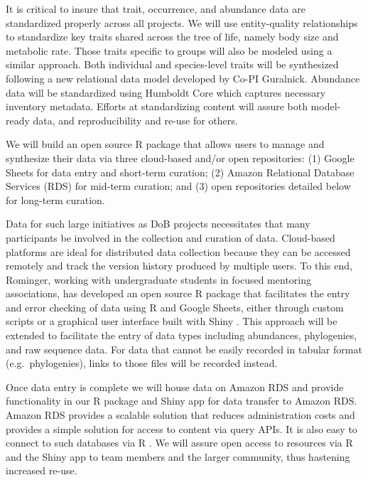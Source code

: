 \documentclass[11pt]{article}
\begin{document}
It is critical to insure that trait, occurrence, and abundance data
are standardized properly across all projects. We will use
entity-quality relationships to standardize key traits shared across
the tree of life, namely body size and metabolic rate. Those traits
specific to groups will also be modeled using a similar approach. Both
individual and species-level traits will be synthesized following a
new relational data model developed by Co-PI Guralnick.  Abundance
data will be standardized using Humboldt Core \cite{Guralnick2017-xb}
which captures necessary inventory metadata. Efforts at standardizing
content will assure both model-ready data, and reproducibility and
re-use for others.

We will build an open source R package that allows users to manage and
synthesize their data via three cloud-based and/or open repositories:
(1) Google Sheets for data entry and short-term curation; (2) Amazon
Relational Database Services (RDS) for mid-term curation; and (3) open
repositories detailed below for long-term curation.

Data for such large initiatives as DoB projects necessitates that many
participants be involved in the collection and curation of data.
Cloud-based platforms are ideal for distributed data collection because
they can be accessed remotely and track the version history produced by
multiple users. To this end, Rominger, working with undergraduate
students in focused mentoring associations, has developed an open source
R package \cite{Rominger2016-mq} that facilitates the entry and error
checking of data using R and Google Sheets, either through custom
scripts or a graphical user interface built with Shiny
\cite{RStudio_Inc2013-bt}. This approach will be extended to facilitate
the entry of data types including abundances, phylogenies, and raw
sequence data. For data that cannot be easily recorded in tabular format
(e.g.~phylogenies), links to those files will be recorded instead.

Once data entry is complete we will house data on Amazon RDS and provide
functionality in our R package and Shiny app for data transfer to Amazon
RDS. Amazon RDS provides a scalable solution that reduces administration
costs and provides a simple solution for access to content via query
APIs. It is also easy to connect to such databases via R
\cite{Wickham2015-cj}. We will assure open access to resources via R and
the Shiny app to team members and the larger community, thus hastening
increased re-use.
\end{document}
